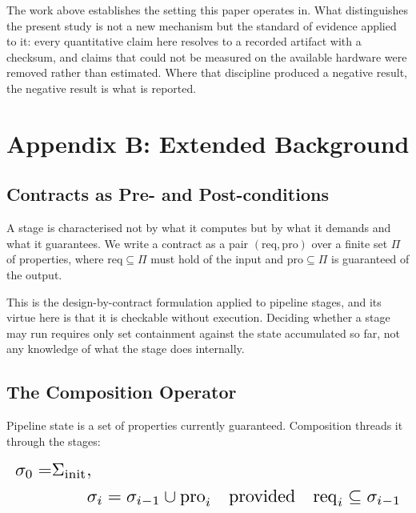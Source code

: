 \documentclass[10pt,journal,compsoc,twocolumn]{IEEEtran}
\begin{document}
The work above establishes the setting this paper operates in. What distinguishes the present study is not a new mechanism but the standard of evidence applied to it: every quantitative claim here resolves to a recorded artifact with a checksum, and claims that could not be measured on the available hardware were removed rather than estimated. Where that discipline produced a negative result, the negative result is what is reported.




\section{Appendix B: Extended Background}



\subsection{Contracts as Pre- and Post-conditions}


A stage is characterised not by what it computes but by what it demands and what it guarantees. We write a contract as a pair $(\mathrm{req}, \mathrm{pro})$ over a finite set $\Pi$ of properties, where $\mathrm{req} \subseteq \Pi$ must hold of the input and $\mathrm{pro} \subseteq \Pi$ is guaranteed of the output.

This is the design-by-contract formulation applied to pipeline stages, and its virtue here is that it is checkable without execution. Deciding whether a stage may run requires only set containment against the state accumulated so far, not any knowledge of what the stage does internally.


\subsection{The Composition Operator}


Pipeline state is a set of properties currently guaranteed. Composition threads it through the stages:




\begin{equation}
\resizebox{\columnwidth}{!}{$\displaystyle
\begin{aligned}
\sigma_0 = & \Sigma_{\text{init}}, \\
& \qquad
\sigma_{i} = \sigma_{i-1} \cup \mathrm{pro}_i \quad \text{provided} \quad \mathrm{req}_i \subseteq \sigma_{i-1}
\end{aligned}
$}
\end{equation}
\end{document}
